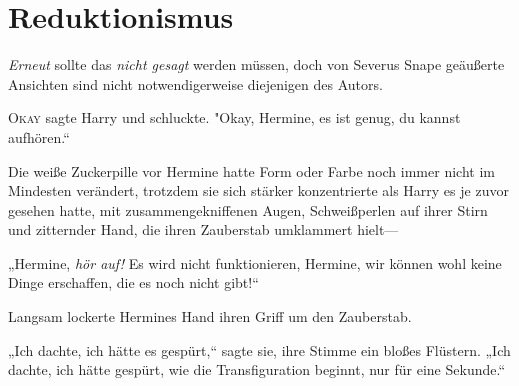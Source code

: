 \chapter{Reduktionismus}

\begin{chapterOpeningAuthorNote}
% 
\emph{Erneut} sollte das \emph{nicht gesagt} werden müssen, doch von Severus Snape geäußerte Ansichten sind nicht notwendigerweise diejenigen des Autors.
\end{chapterOpeningAuthorNote}

\lettrine[ante=„]{O}{kay} sagte Harry und schluckte. "Okay, Hermine, es ist genug, du kannst aufhören.“

Die weiße Zuckerpille vor Hermine hatte Form oder Farbe noch immer nicht im Mindesten verändert, trotzdem sie sich stärker konzentrierte als Harry es je zuvor gesehen hatte, mit zusammengekniffenen Augen, Schweißperlen auf ihrer Stirn und zitternder Hand, die ihren Zauberstab umklammert hielt—

„Hermine, \emph{hör auf!} Es wird nicht funktionieren, Hermine, wir können wohl keine Dinge erschaffen, die es noch nicht gibt!“

Langsam lockerte Hermines Hand ihren Griff um den Zauberstab.

„Ich dachte, ich hätte es gespürt,“ sagte sie, ihre Stimme ein bloßes Flüstern. „Ich dachte, ich hätte gespürt, wie die Transfiguration beginnt, nur für eine Sekunde.“

